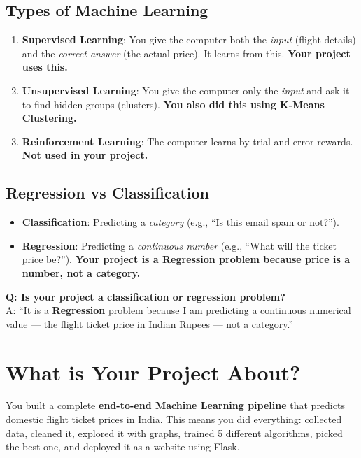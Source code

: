 \documentclass[12pt, a4paper]{article}
\begin{document}
\subsection{Types of Machine Learning}
\begin{enumerate}
    \item \textbf{Supervised Learning}: You give the computer both the \textit{input} (flight details) and the \textit{correct answer} (the actual price). It learns from this. \textbf{Your project uses this.}
    \item \textbf{Unsupervised Learning}: You give the computer only the \textit{input} and ask it to find hidden groups (clusters). \textbf{You also did this using K-Means Clustering.}
    \item \textbf{Reinforcement Learning}: The computer learns by trial-and-error rewards. \textbf{Not used in your project.}
\end{enumerate}

\subsection{Regression vs Classification}
\begin{itemize}
    \item \textbf{Classification}: Predicting a \textit{category} (e.g., ``Is this email spam or not?'').
    \item \textbf{Regression}: Predicting a \textit{continuous number} (e.g., ``What will the ticket price be?''). \textbf{Your project is a Regression problem because price is a number, not a category.}
\end{itemize}

\begin{warnbox}
    \textbf{Q: Is your project a classification or regression problem?} \\
    A: ``It is a \textbf{Regression} problem because I am predicting a continuous numerical value — the flight ticket price in Indian Rupees — not a category.''
\end{warnbox}


\section{What is Your Project About?}

\begin{conceptbox}
    You built a complete \textbf{end-to-end Machine Learning pipeline} that predicts domestic flight ticket prices in India. This means you did everything: collected data, cleaned it, explored it with graphs, trained 5 different algorithms, picked the best one, and deployed it as a website using Flask.
\end{conceptbox}
\end{document}
